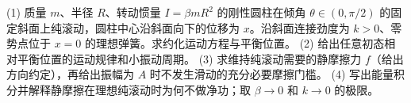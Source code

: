(1) 质量 \(m\)、半径 \(R\)、转动惯量 \(I=\beta mR^2\) 的刚性圆柱在倾角 \(\theta\in(0,\pi/2)\) 的固定斜面上纯滚动，圆柱中心沿斜面向下的位移为 \(x\)。沿斜面连接劲度为 \(k>0\)、零势点位于 \(x=0\) 的理想弹簧。求约化运动方程与平衡位置。
(2) 给出任意初态相对平衡位置的运动规律和小振动周期。
(3) 求维持纯滚动需要的静摩擦力 \(f\)（给出方向约定），再给出振幅为 \(A\) 时不发生滑动的充分必要摩擦门槛。
(4) 写出能量积分并解释静摩擦在理想纯滚动时为何不做净功；取 \(\beta\to0\) 和 \(k\to0\) 的极限。
